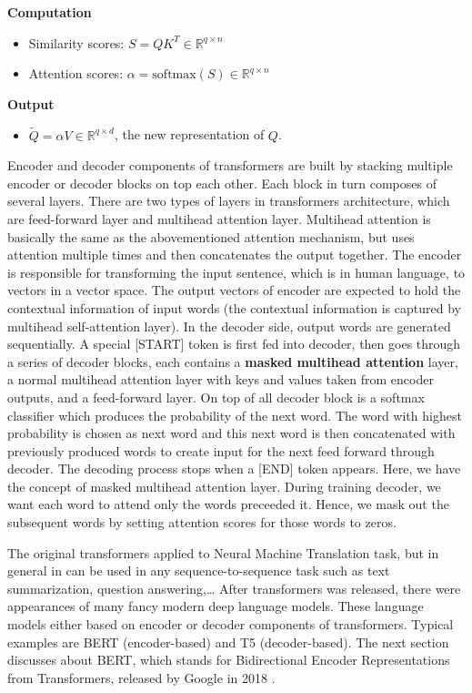 \documentclass[12pt, sort&compress]{report}
\begin{document}
\par \textbf{Computation}
\begin{itemize}
	\item Similarity scores: $S = QK^T \in \mathbb{R}^{q \times n}$
	\item Attention scores: $\mathbb{\alpha} = \text{softmax}(S) \in \mathbb{R}^{q \times n}$
\end{itemize}
\par \textbf{Output}
\begin{itemize}
	\item $\tilde{Q} = \mathbb{\alpha}V \in \mathbb{R}^{q \times d}$, the new representation of $Q$.
\end{itemize}
\par Encoder and decoder components of transformers are built by stacking multiple encoder or decoder blocks on top each other. Each block in turn composes of several layers. There are two types of layers in transformers architecture, which are feed-forward layer and multihead attention layer. Multihead attention is basically the same as the abovementioned attention mechanism, but uses attention multiple times and then concatenates the output together. The encoder is responsible for transforming the input sentence, which is in human language, to vectors in a vector space. The output vectors of encoder are expected to hold the contextual information of input words (the contextual information is captured by multihead self-attention layer). In the decoder side, output words are generated sequentially. A special [START] token is first fed into  decoder, then goes through a series of decoder blocks, each contains a \textbf{masked multihead attention} layer, a normal multihead attention layer with keys and values taken from encoder outputs, and a feed-forward layer. On top of all decoder block is a softmax classifier which produces the probability of the next word. The word with highest probability is chosen as next word and this next word is then concatenated with previously produced words to create input for the next feed forward through decoder. The decoding process stops when a [END] token appears. Here, we have the concept of masked multihead attention layer. During training decoder, we want each word to attend only the words preceeded it. Hence, we mask out the subsequent words by setting attention scores for those words to zeros. 
\par The original transformers applied to Neural Machine Translation task, but in general in can be used in any sequence-to-sequence task such as text summarization, question answering,… After transformers was released, there were appearances of many fancy modern deep language models. These language models either based on encoder or decoder components of transformers. Typical examples are BERT (encoder-based) and T5 (decoder-based). The next section discusses about BERT, which stands for Bidirectional Encoder Representations from Transformers, released by Google in 2018 \cite{devlin2018bert}.
\end{document}
